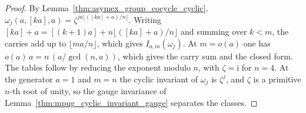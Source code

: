 \begin{proof}
    \leanok
    By Lemma~\ref{thm:asymex_group_cocycle_cyclic},
    $\omega_j(a,[ka],a)=\zeta^{ja\lfloor([ka]+a)/n\rfloor}$. Writing
    $[ka]+a=[(k+1)a]+n\lfloor([ka]+a)/n\rfloor$ and summing over $k<m$, the
    carries add up to $\lfloor ma/n\rfloor$, which gives $I_{a,m}(\omega_j)$.
    At $m=o(a)$ one has $o(a)\,a=n\,(a/\gcd(n,a))$, which gives the carry sum
    and the closed form. The tables follow by reducing the exponent modulo
    $n$, with $\zeta=\mathrm{i}$ for $n=4$. At the generator $a=1$ and $m=n$
    the cyclic invariant of $\omega_j$ is $\zeta^j$, and $\zeta$ is a
    primitive $n$-th root of unity, so the gauge invariance of
    Lemma~\ref{thm:mpug_cyclic_invariant_gauge} separates the classes.
\end{proof}

